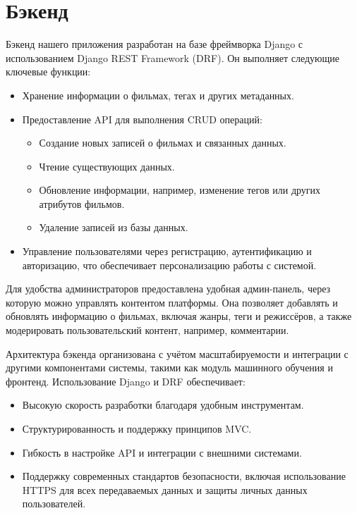\section*{Бэкенд}

Бэкенд нашего приложения разработан на базе фреймворка Django с использованием Django REST Framework (DRF). Он выполняет следующие ключевые функции:
\begin{itemize}
    \item Хранение информации о фильмах, тегах и других метаданных.
    \item Предоставление API для выполнения CRUD операций:
    \begin{itemize}
        \item Создание новых записей о фильмах и связанных данных.
        \item Чтение существующих данных.
        \item Обновление информации, например, изменение тегов или других атрибутов фильмов.
        \item Удаление записей из базы данных.
    \end{itemize}
    \item Управление пользователями через регистрацию, аутентификацию и авторизацию, что обеспечивает персонализацию работы с системой.
\end{itemize}

Для удобства администраторов предоставлена удобная админ-панель, через которую можно управлять контентом платформы. Она позволяет добавлять и обновлять информацию о фильмах, включая жанры, теги и режиссёров, а также модерировать пользовательский контент, например, комментарии.

Архитектура бэкенда организована с учётом масштабируемости и интеграции с другими компонентами системы, такими как модуль машинного обучения и фронтенд. Использование Django и DRF обеспечивает:
\begin{itemize}
    \item Высокую скорость разработки благодаря удобным инструментам.
    \item Структурированность и поддержку принципов MVC.
    \item Гибкость в настройке API и интеграции с внешними системами.
    \item Поддержку современных стандартов безопасности, включая использование HTTPS для всех передаваемых данных и защиты личных данных пользователей.
\end{itemize}

